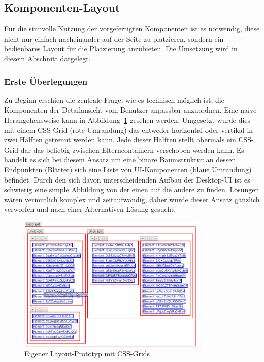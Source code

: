 \subsection{Komponenten-Layout}
Für die sinnvolle Nutzung der vorgefertigten Komponenten ist es notwendig, diese nicht nur einfach nacheinander auf der Seite zu platzieren, sondern ein bedienbares Layout für die Platzierung anzubieten. Die Umsetzung wird in diesem Abschnitt dargelegt.

\subsubsection{Erste Überlegungen}
Zu Beginn erschien die zentrale Frage, wie es technisch möglich ist, die Komponenten der Detailansicht vom Benutzer anpassbar anzuordnen. Eine naive Herangehensweise kann in Abbildung~\ref{fig:layout_grid_test} gesehen werden. Umgesetzt wurde dies mit einem CSS-Grid (rote Umrandung) das entweder horizontal oder vertikal in zwei Hälften getrennt werden kann. Jede dieser Hälften stellt abermals ein CSS-Grid dar das beliebig zwischen Elterncontainern verschoben werden kann. Es handelt es sich bei diesem Ansatz um eine binäre Baumstruktur an dessen Endpunkten (Blätter) sich eine Liste von UI-Komponenten (blaue Umrandung) befindet. Durch den sich davon unterscheidenden Aufbau der Desktop-UI ist es schwierig eine simple Abbildung von der einen auf die andere zu finden. Lösungen wären vermutlich komplex und zeitaufwändig, daher wurde dieser Ansatz gänzlich verworfen und nach einer Alternativen Lösung gesucht.

\begin{figure}
    \centering
    \captionsetup{justification=centering}
    \includegraphics[width=0.8\textwidth]{figures/layout_grid_test.png}
        \caption{Eigener Layout-Prototyp mit CSS-Grids}\label{fig:layout_grid_test}
\end{figure}

